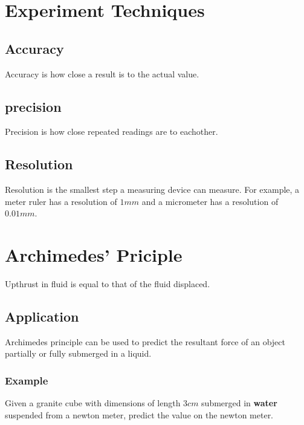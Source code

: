 \documentclass{article}
\begin{document}
\section{Experiment Techniques}

\subsection{Accuracy}
Accuracy is how close a result is to the actual value.

\subsection{precision}
Precision is how close repeated readings are to eachother.

\subsection{Resolution}
Resolution is the smallest step a measuring device can measure.
For example, a meter ruler has a resolution of $1\si{mm}$ and a micrometer has
a resolution of $0.01\si{mm}$.


\break

\section{Archimedes' Priciple}
Upthrust in fluid is equal to that of the fluid displaced.

\subsection{Application}
Archimedes principle can be used to predict the resultant force of an object partially or fully submerged in a liquid.

\subsubsection{Example}
Given a granite cube with dimensions of length $3\si{cm}$ submerged in \textbf{water} suspended from a newton meter, predict the value on
the newton meter.

\begin{center}
\end{center}
\end{document}
